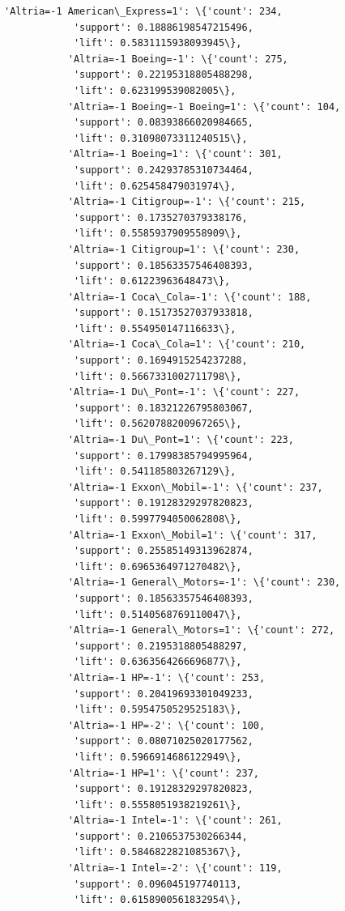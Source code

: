 \documentclass[11pt]{article}
\begin{document}
\begin{Verbatim}[commandchars=\\\{\}]
           'Altria=-1 American\_Express=1': \{'count': 234,
            'support': 0.18886198547215496,
            'lift': 0.5831115938093945\},
           'Altria=-1 Boeing=-1': \{'count': 275,
            'support': 0.22195318805488298,
            'lift': 0.623199539082005\},
           'Altria=-1 Boeing=-1 Boeing=1': \{'count': 104,
            'support': 0.08393866020984665,
            'lift': 0.31098073311240515\},
           'Altria=-1 Boeing=1': \{'count': 301,
            'support': 0.24293785310734464,
            'lift': 0.625458479031974\},
           'Altria=-1 Citigroup=-1': \{'count': 215,
            'support': 0.1735270379338176,
            'lift': 0.5585937909558909\},
           'Altria=-1 Citigroup=1': \{'count': 230,
            'support': 0.18563357546408393,
            'lift': 0.61223963648473\},
           'Altria=-1 Coca\_Cola=-1': \{'count': 188,
            'support': 0.15173527037933818,
            'lift': 0.554950147116633\},
           'Altria=-1 Coca\_Cola=1': \{'count': 210,
            'support': 0.1694915254237288,
            'lift': 0.5667331002711798\},
           'Altria=-1 Du\_Pont=-1': \{'count': 227,
            'support': 0.18321226795803067,
            'lift': 0.5620788200967265\},
           'Altria=-1 Du\_Pont=1': \{'count': 223,
            'support': 0.17998385794995964,
            'lift': 0.541185803267129\},
           'Altria=-1 Exxon\_Mobil=-1': \{'count': 237,
            'support': 0.19128329297820823,
            'lift': 0.5997794050062808\},
           'Altria=-1 Exxon\_Mobil=1': \{'count': 317,
            'support': 0.25585149313962874,
            'lift': 0.6965364971270482\},
           'Altria=-1 General\_Motors=-1': \{'count': 230,
            'support': 0.18563357546408393,
            'lift': 0.5140568769110047\},
           'Altria=-1 General\_Motors=1': \{'count': 272,
            'support': 0.2195318805488297,
            'lift': 0.6363564266696877\},
           'Altria=-1 HP=-1': \{'count': 253,
            'support': 0.20419693301049233,
            'lift': 0.5954750529525183\},
           'Altria=-1 HP=-2': \{'count': 100,
            'support': 0.08071025020177562,
            'lift': 0.5966914686122949\},
           'Altria=-1 HP=1': \{'count': 237,
            'support': 0.19128329297820823,
            'lift': 0.5558051938219261\},
           'Altria=-1 Intel=-1': \{'count': 261,
            'support': 0.2106537530266344,
            'lift': 0.5846822821085367\},
           'Altria=-1 Intel=-2': \{'count': 119,
            'support': 0.096045197740113,
            'lift': 0.6158900561832954\},

\end{Verbatim}
\end{document}
